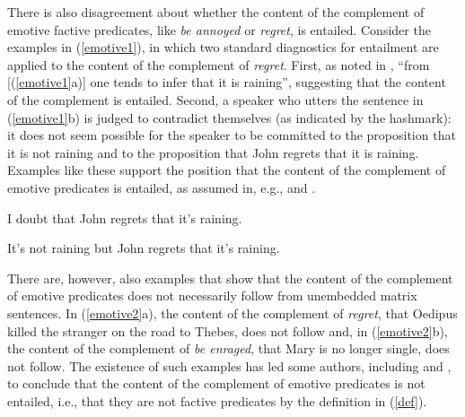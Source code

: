 \documentclass[11pt,fleqn]{article}
\def\infelic{{\leavevmode\llap{\#}}}
\newcommand{\6}{\mbox{$[\hspace*{-.6mm}[$}}
\newcommand{\9}{\mbox{$]\hspace*{-.6mm}]$}}
\begin{document}
\begin{itemize}
There is also disagreement about whether the content of the complement of emotive factive predicates, like {\em be annoyed} or {\em regret}, is entailed. Consider the examples in (\ref{emotive1}), in which two standard diagnostics for entailment are applied to the content of the complement of {\em regret}. First, as noted in \citealt[514]{abrusan2011}, ``from [(\ref{emotive1}a)] one tends to infer that it is raining'', suggesting that the content of the complement is entailed. Second, a speaker who utters the sentence in (\ref{emotive1}b) is judged to contradict themselves (as indicated by the hashmark): it does not seem possible for the speaker to be committed to the proposition that it is not raining and to the proposition that John regrets that it is raining. Examples like these support the position that the content of the  complement of emotive predicates is entailed, as assumed in, e.g., \citealt{gazdar79a,abrusan2011} and \citealt{anand-hacquard2014}.

\begin{exe}

\ex\label{emotive1} \citealt[514]{abrusan2011}

\begin{xlist}

\ex I doubt that John regrets that it's raining.

\ex \infelic It's not raining but John regrets that it's raining. 

\end{xlist}

\end{exe}

There are, however, also examples that show that the content of the complement of emotive predicates does not necessarily follow from unembedded matrix sentences. In (\ref{emotive2}a), the content of the complement of {\em regret}, that Oedipus killed the stranger on the road to Thebes, does not follow and, in (\ref{emotive2}b), the content of the complement of {\em be enraged}, that Mary is no longer single, does not follow. The existence of such examples has led some authors, including \citet{klein1975,giannakidou1998,schlenker2003} and \citet{egre2008}, to conclude that the content of the complement of emotive predicates is not entailed, i.e., that they are not factive predicates by the definition in (\ref{def}).

\begin{exe}

\ex\label{emotive2}

\begin{xlist}


\end{xlist}
\end{exe}
\end{itemize}
\end{document}
